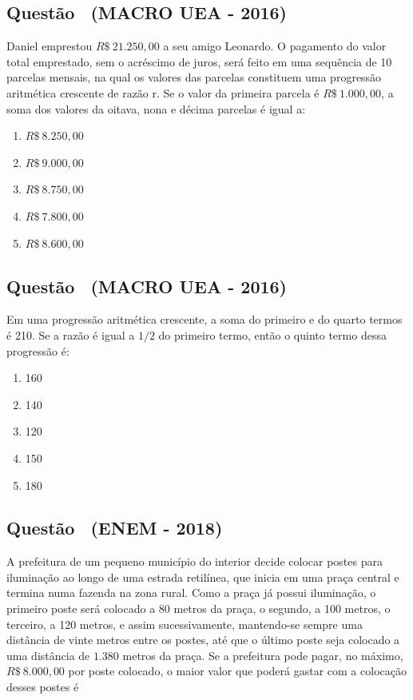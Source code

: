 \documentclass[12pt]{article}
\newcounter{questao}
\newcommand{\novaquestao}[1]{%
  \stepcounter{questao}%
  \subsection*{Questão \thequestao\ (#1)}%
}
\begin{document}
\begin{multicols}{2}
            \novaquestao{MACRO UEA - 2016}

                Daniel emprestou $R\$\ 21.250,00$ a seu amigo Leonardo. O pagamento do valor total emprestado, sem o acréscimo de juros, será feito em uma sequência de 10 parcelas mensais, na qual os valores das parcelas constituem uma progressão aritmética crescente de razão r. Se o valor da primeira parcela é $R\$\ 1.000,00$, a soma dos valores da oitava, nona e décima parcelas é igual a:
            
                \begin{enumerate}[label=(\alph*), noitemsep]
                    \item $R\$\ 8.250,00$
                    \item $R\$\ 9.000,00$
                    \item $R\$\ 8.750,00$
                    \item $R\$\ 7.800,00$
                    \item $R\$\ 8.600,00$
                \end{enumerate}

        \novaquestao{MACRO UEA - 2016}
        
            Em uma progressão aritmética crescente, a soma do primeiro e do quarto termos é 210. Se a razão é igual a ${1}/{2}$ do primeiro termo, então o quinto termo dessa progressão é:
        
            \begin{enumerate}[label=(\alph*), noitemsep]
                \item 160
                \item 140
                \item 120
                \item 150
                \item 180
            \end{enumerate}

        \novaquestao{ENEM - 2018}

            A prefeitura de um pequeno município do interior decide colocar postes para iluminação ao longo de uma estrada retilínea, que inicia em uma praça central e termina numa fazenda na zona rural. Como a praça já possui iluminação, o primeiro poste será colocado a 80 metros da praça, o segundo, a 100 metros, o terceiro, a 120 metros, e assim sucessivamente, mantendo-se sempre uma distância de vinte metros entre os postes, até que o último poste seja colocado a uma distância de $1.380$ metros da praça. Se a prefeitura pode pagar, no máximo, $R\$\ 8.000,00$ por poste colocado, o maior valor que poderá gastar com a colocação desses postes é


\end{multicols}
\end{document}
